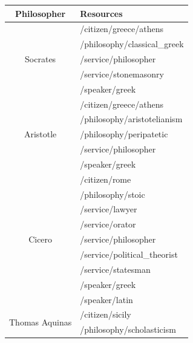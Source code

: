 \begin{table}
	\begin{center}
		\begin{tabular}{| c | l |}
			\hline
			  Philosopher & Resources \\
			\hline
			\hline
			  \multirow{5}{*}{Socrates}              & /citizen/greece/athens \\
			                                         & /philosophy/classical\_greek \\
			                                         & /service/philosopher \\
			                                         & /service/stonemasonry \\
			                                         & /speaker/greek \\
			\hline
			  \multirow{5}{*}{Aristotle}             & /citizen/greece/athens \\
			                                         & /philosophy/aristotelianism \\
			                                         & /philosophy/peripatetic \\
			                                         & /service/philosopher \\
			                                         & /speaker/greek \\
			\hline
			  \multirow{9}{*}{Cicero}                & /citizen/rome \\
			                                         & /philosophy/stoic \\
			                                         & /service/lawyer \\
			                                         & /service/orator \\
			                                         & /service/philosopher \\
			                                         & /service/political\_theorist \\
			                                         & /service/statesman \\
			                                         & /speaker/greek \\
			                                         & /speaker/latin \\
			\hline
			  \multirow{8}{*}{Thomas Aquinas}        & /citizen/sicily \\
			                                         & /philosophy/scholasticism \\

\end{tabular}
\end{center}
\end{table}
